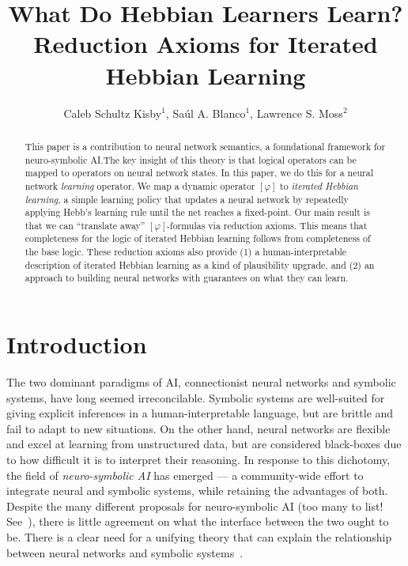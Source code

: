 \documentclass[letterpaper]{article}
\title{What Do Hebbian Learners Learn?\\Reduction Axioms for Iterated Hebbian Learning}
\author{Caleb Schultz Kisby$^1$, Sa\'{u}l A. Blanco$^1$, Lawrence S. Moss$^2$}
\theoremstyle{definition}
\newcommand{\Hebbop}[1]{[#1]}
\begin{document}
\maketitle

\begin{abstract}
This paper is a contribution to neural network semantics, a foundational framework for neuro-symbolic AI.\@  The key insight of this theory is that logical operators can be mapped to operators on neural network states.  In this paper, we do this for a neural network \emph{learning} operator.  We map a dynamic operator $\Hebbop{\varphi}$ to \emph{iterated Hebbian learning}, a simple learning policy that updates a neural network by repeatedly applying Hebb's learning rule until the net reaches a fixed-point.  Our main result is that we can ``translate away'' $\Hebbop{\varphi}$-formulas via reduction axioms.  This means that completeness for the logic of iterated Hebbian learning follows from completeness of the base logic.  These reduction axioms also provide (1) a human-interpretable description of iterated Hebbian learning as a kind of plausibility upgrade, and (2) an approach to building neural networks with guarantees on what they can learn.
\end{abstract}

\section{Introduction}

The two dominant paradigms of AI, connectionist neural networks and symbolic systems, have long seemed irreconcilable.  Symbolic systems are well-suited for giving explicit inferences in a human-interpretable language, but are brittle and fail to adapt to new situations.  On the other hand, neural networks are flexible and excel at learning from unstructured data, but are considered black-boxes due to how difficult it is to interpret their reasoning.  In response to this dichotomy, the field of \emph{neuro-symbolic AI} has emerged --- a community-wide effort to integrate neural and symbolic systems, while retaining the advantages of both.  Despite the many different proposals for neuro-symbolic AI (too many to list! See~\cite{bader2005dimensions, Besold2017NeuralSymbolicLA, sarker2021neuro}), there is little agreement on what the interface between the two ought to be.  There is a clear need for a unifying theory that can explain the relationship between neural networks and symbolic systems~\cite{harmelen2022preface}.
\end{document}
